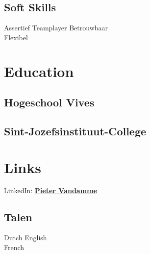 \documentclass[a4paper]{deedy-resume} %
\begin{document}
\begin{minipage}[t]{0.33\textwidth}
\sectionspace %

\subsection{Soft Skills}
Assertief\textbullet{} Teamplayer \textbullet{} Betrouwbaar \\ Flexibel
\sectionspace %


\section{Education} 

\subsection{Hogeschool Vives}


\sectionspace %

\subsection{Sint-Jozefsinstituut-College}


\sectionspace %


\section{Links} 

LinkedIn: \href{https://be.linkedin.com/in/pieter-vandamme-700b03a0}{\bf Pieter Vandamme} 

\sectionspace %

\subsection{Talen}

Dutch \textbullet{} English  \\

\vspace{\topsep} %
French

\sectionspace %


\end{minipage} %
\end{document}

